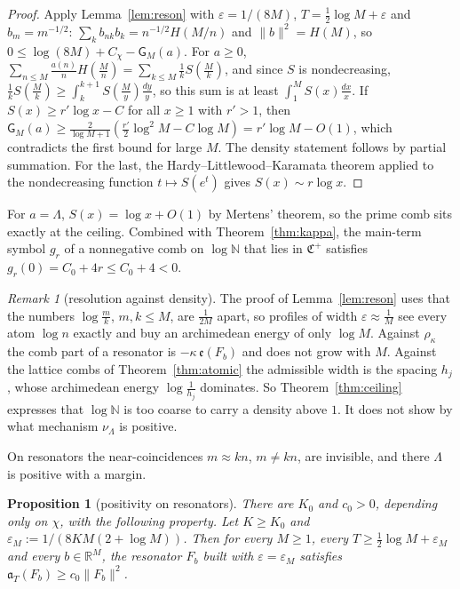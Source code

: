 \documentclass[11pt]{amsart}
\newtheorem{proposition}[theorem]{Proposition}
\theoremstyle{definition}
\theoremstyle{remark}
\newtheorem{remark}[theorem]{Remark}
\newcommand{\R}{\mathbb R}
\newcommand{\N}{\mathbb N}
\begin{document}
\begin{proof}
Apply Lemma~\ref{lem:reson} with $\varepsilon=1/(8M)$, $T=\frac12\log M+\varepsilon$ and $b_m=m^{-1/2}$: $\sum_kb_{nk}b_k=n^{-1/2}H(M/n)$ and
$\|b\|^2=H(M)$, so $0\le\log(8M)+C_\chi-\mathsf G_M(a)$. For $a\ge0$, $\sum_{n\le M}\frac{a(n)}nH(\frac Mn)=\sum_{k\le M}\frac1kS(\frac Mk)$,
and since $S$ is nondecreasing, $\frac1kS(\frac Mk)\ge\int_k^{k+1}S(\frac My)\frac{dy}y$, so this sum is at least
$\int_1^MS(x)\frac{dx}x$. If $S(x)\ge r'\log x-C$ for all $x\ge1$ with $r'>1$, then
$\mathsf G_M(a)\ge\frac{2}{\log M+1}(\frac{r'}2\log^2M-C\log M)=r'\log M-O(1)$, which contradicts the first bound for large $M$.
The density statement follows by partial summation. For the last, the Hardy--Littlewood--Karamata theorem
\cite[Thm.~I.15.1]{Korevaar2004} applied to the nondecreasing function $t\mapsto S(e^t)$ gives $S(x)\sim r\log x$.
\end{proof}

For $a=\Lambda$, $S(x)=\log x+O(1)$ by Mertens' theorem, so the prime comb sits exactly at the ceiling. Combined with
Theorem~\ref{thm:kappa}, the main-term symbol $g_r$ of a nonnegative comb on $\log\N$ that lies in $\mathfrak C^+$ satisfies
$g_r(0)=C_0+4r\le C_0+4<0$.

\begin{remark}[resolution against density]\label{rem:resolution}
The proof of Lemma~\ref{lem:reson} uses that the numbers $\log\frac mk$, $m,k\le M$, are $\frac1{2M}$ apart, so profiles of width
$\varepsilon\approx\frac1M$ see every atom $\log n$ exactly and buy an archimedean energy of only $\log M$. Against
$\rho_\kappa$ the comb part of a resonator is $-\kappa\,\mathfrak e(F_b)$ and does not grow with $M$. Against the lattice combs of
Theorem~\ref{thm:atomic} the admissible width is the spacing $h_j$, whose archimedean energy $\log\frac1{h_j}$ dominates. So
Theorem~\ref{thm:ceiling} expresses that $\log\N$ is too coarse to carry a density above $1$. It does not show by what mechanism
$\nu_\Lambda$ is positive.
\end{remark}

On resonators the near-coincidences $m\approx kn$, $m\ne kn$, are invisible, and there $\Lambda$ is positive with a margin.

\begin{proposition}[positivity on resonators]\label{prop:nearfree}
There are $K_0$ and $c_0>0$, depending only on $\chi$, with the following property. Let $K\ge K_0$ and
$\varepsilon_M:=1/(8KM(2+\log M))$. Then for every $M\ge1$, every $T\ge\frac12\log M+\varepsilon_M$ and every $b\in\R^M$, the
resonator $F_b$ built with $\varepsilon=\varepsilon_M$ satisfies $\mathfrak a_T(F_b)\ge c_0\|F_b\|^2$.
\end{proposition}
\end{document}
